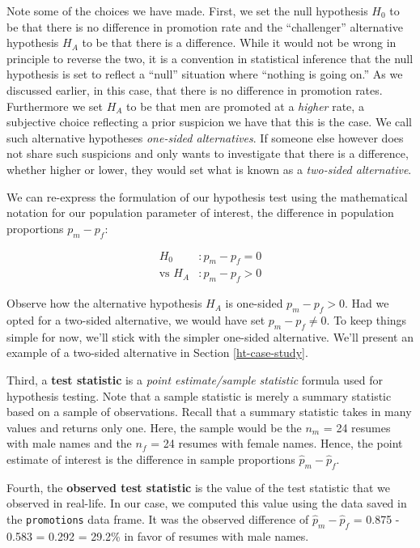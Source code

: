\documentclass[
]{book}
\begin{document}
Note some of the choices we have made. First, we set the null hypothesis \(H_0\) to be that there is no difference in promotion rate and the ``challenger'' alternative hypothesis \(H_A\) to be that there is a difference. While it would not be wrong in principle to reverse the two, it is a convention in statistical inference that the null hypothesis is set to reflect a ``null'' situation where ``nothing is going on.'' As we discussed earlier, in this case, that there is no difference in promotion rates. Furthermore we set \(H_A\) to be that men are promoted at a \emph{higher} rate, a subjective choice reflecting a prior suspicion we have that this is the case. We call such alternative hypotheses  \emph{one-sided alternatives}. If someone else however does not share such suspicions and only wants to investigate that there is a difference, whether higher or lower, they would set what is known as a  \emph{two-sided alternative}.

We can re-express the formulation of our hypothesis test using the mathematical notation for our population parameter of interest, the difference in population proportions \(p_{m} - p_{f}\):

\[
\begin{aligned}
H_0 &: p_{m} - p_{f} = 0\\
\text{vs } H_A&: p_{m} - p_{f} > 0
\end{aligned}
\]

Observe how the alternative hypothesis \(H_A\) is one-sided \(p_{m} - p_{f} > 0\). Had we opted for a two-sided alternative, we would have set \(p_{m} - p_{f} \neq 0\). To keep things simple for now, we'll stick with the simpler one-sided alternative. We'll present an example of a two-sided alternative in Section \ref{ht-case-study}.

Third, a \textbf{test statistic}  is a \emph{point estimate/sample statistic} formula used for hypothesis testing. Note that a sample statistic is merely a summary statistic based on a sample of observations. Recall that a summary statistic takes in many values and returns only one. Here, the sample would be the \(n_m\) = 24 resumes with male names and the \(n_f\) = 24 resumes with female names. Hence, the point estimate of interest is the difference in sample proportions \(\widehat{p}_{m} - \widehat{p}_{f}\).

Fourth, the \textbf{observed test statistic}  is the value of the test statistic that we observed in real-life. In our case, we computed this value using the data saved in the \texttt{promotions} data frame. It was the observed difference of \(\widehat{p}_{m} -\widehat{p}_{f}\) = 0.875 - 0.583 = 0.292 = 29.2\% in favor of resumes with male names.
\end{document}
